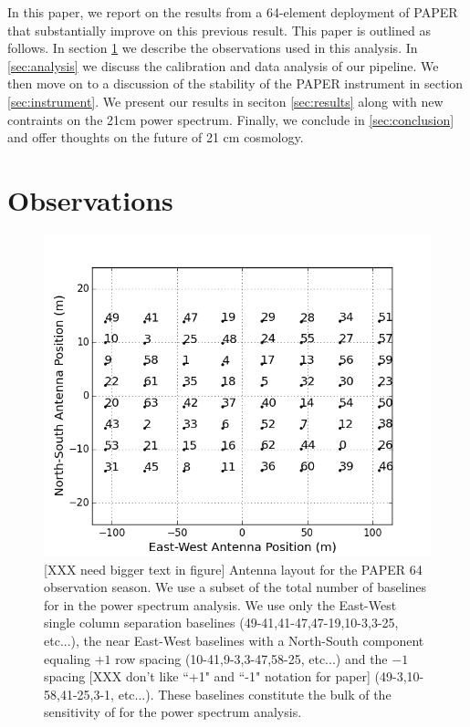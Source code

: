 \documentclass[twocolumn,numberedappendix]{emulateapj} \shorttitle{PSA64}
\begin{document}
In this paper, we report on the results from a 64-element deployment of PAPER
that substantially improve on this previous result.
 This paper is outlined as follows. In section
\ref{sec:observations} we describe the observations used in this analysis. In
\ref{sec:analysis} we discuss the calibration and data analysis of our pipeline.
We then move on to a discussion of the stability of the PAPER instrument in
section \ref{sec:instrument}. We present our results in seciton
\ref{sec:results} along with new contraints on the 21cm power spectrum.
Finally, we conclude in \ref{sec:conclusion} and offer thoughts on the future
of 21 cm cosmology.

\section{Observations}\label{sec:observations}

\begin{figure}[!t]\centering
\includegraphics[width=\columnwidth]{plots/antenna_positions.png}
\caption{
[XXX need bigger text in figure]
Antenna layout for the PAPER 64 observation season. We use a subset of
the total number of baselines for in the power spectrum analysis. We use only
the East-West single column separation baselines (49-41,41-47,47-19,10-3,3-25,
etc...), the near East-West baselines with a North-South component equaling
$+1$ row spacing (10-41,9-3,3-47,58-25, etc...) and the $-1$ spacing
[XXX don't like ``+1" and ``-1" notation for paper]
(49-3,10-58,41-25,3-1, etc...). These baselines constitute the bulk of the
sensitivity of for the power spectrum analysis.}
\label{fig:antenna_positions}
\end{figure}
\end{document}
